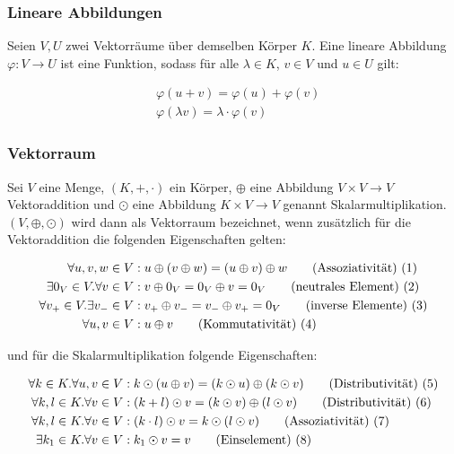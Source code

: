 \documentclass[a4paper,fontsize=12pt,toc=bib,halfparskip,ngerman]{scrartcl}
\begin{document}
\subsubsection{Lineare Abbildungen}
Seien $V,U$ zwei Vektorr\"aume \"uber demselben K\"orper $K$. Eine lineare Abbildung $\varphi: V \rightarrow U$ ist eine Funktion, sodass f\"ur alle $\lambda \in K$, $v \in V$ und $u \in U$ gilt\cite[S.~85]{bowen2008introduction}:

\begin{align}
	&\varphi(u+v) = \varphi(u) + \varphi(v) \\
	&\varphi(\lambda v) = \lambda \cdot \varphi(v)
\end{align}

\subsubsection{Vektorraum}
Sei $V$ eine Menge, $(K, +, \cdot )$ ein K\"orper, $\oplus$ eine Abbildung $V \times V \rightarrow V$  Vektoraddition und $\odot$ eine Abbildung $K \times V \rightarrow V$ genannt Skalarmultiplikation. $(V, \oplus, \odot)$ wird dann als Vektorraum bezeichnet, wenn zus\"atzlich f\"ur die Vektoraddition die folgenden Eigenschaften gelten: 

\begin{align}
	\forall u,v,w \in V&: u \oplus (v \oplus w ) = (u \oplus v ) \oplus w 	\tag{Assoziativit\"at) (\addtocounter{equation}{1}\theequation}\\
	\exists 0_V \in V. \forall v \in V&: v\oplus 0_V = 0_V \oplus v = 0_V 	\tag{neutrales Element) (\addtocounter{equation}{1}\theequation}\\
	\forall v_+ \in V. \exists v_- \in V&: v_+ \oplus v_- = v_- \oplus v_+ = 0_V	\tag{inverse Elemente) (\addtocounter{equation}{1}\theequation}\\
	\forall u, v \in V&: u \oplus v    \tag{Kommutativit\"at) (\addtocounter{equation}{1}\theequation}
\end{align}

und f\"ur die Skalarmultiplikation folgende Eigenschaften:

\begin{align}
	\forall k \in K. \forall u,v \in V&: k \odot (u \oplus v ) = (k \odot u ) \oplus( k \odot v) 	\tag{Distributivit\"at) (\addtocounter{equation}{1}\theequation}\\
	\forall k, l \in K. \forall v \in V&: ( k + l ) \odot v = (k \odot v ) \oplus( l \odot v) 	\tag{Distributivit\"at) (\addtocounter{equation}{1}\theequation}\\
	\forall k, l \in K. \forall v \in V&: (k \cdot l) \odot v = k \odot (l \odot v)	\tag{Assoziativit\"at) (\addtocounter{equation}{1}\theequation}\\
	\exists k_1 \in K. \forall v \in V&: k_1 \odot v = v	\tag{Einselement) (\addtocounter{equation}{1}\theequation}
\end{align}
\end{document}
